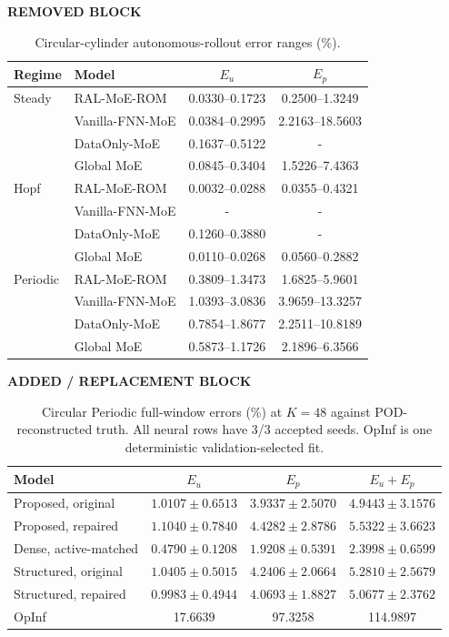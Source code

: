 \documentclass{article}
\providecommand{\DIFaddbegin}{} %
\providecommand{\DIFaddend}{} %
\providecommand{\DIFdelbegin}{} %
\providecommand{\DIFdelend}{} %
\begin{document}
\DIFdelbegin 
{\color{red}
\begin{table}[H]
\color{red}\noindent\textbf{REMOVED BLOCK}\par
\centering
\caption{Circular-cylinder autonomous-rollout error ranges (\%). }
\label{old:tab:circular_full}
\small
\setlength{\tabcolsep}{4pt}
\begin{tabular}{llcc}
\toprule
Regime & Model & $E_u$ & $E_p$ \\
\midrule
Steady & RAL-MoE-ROM & 0.0330--0.1723 & 0.2500--1.3249 \\
 & Vanilla-FNN-MoE & 0.0384--0.2995 & 2.2163--18.5603 \\
 & DataOnly-MoE & 0.1637--0.5122 & - \\
 & Global MoE & 0.0845--0.3404 & 1.5226--7.4363 \\
\midrule
Hopf & RAL-MoE-ROM & 0.0032--0.0288 & 0.0355--0.4321 \\
 & Vanilla-FNN-MoE & - & -  \\
 & DataOnly-MoE & 0.1260--0.3880 & - \\
 & Global MoE & 0.0110--0.0268 & 0.0560--0.2882 \\
\midrule
Periodic & RAL-MoE-ROM & 0.3809--1.3473 & 1.6825--5.9601 \\
 & Vanilla-FNN-MoE & 1.0393--3.0836 & 3.9659--13.3257 \\
 & DataOnly-MoE & 0.7854--1.8677 & 2.2511--10.8189 \\
 & Global MoE & 0.5873--1.1726 & 2.1896--6.3566 \\
\bottomrule
\end{tabular}
\end{table}
}
\DIFdelend \DIFaddbegin 
{\color{blue}
\begin{table}[H]
\color{blue}\noindent\textbf{ADDED / REPLACEMENT BLOCK}\par
\centering
\caption{Circular Periodic full-window errors (\%) at $K=48$ against
POD-reconstructed truth. All neural rows have 3/3 accepted seeds.
OpInf is one deterministic validation-selected fit.}
\label{tab:circular_full}
\small
\setlength{\tabcolsep}{3pt}
\begin{tabular}{@{}lccc@{}}
\toprule
Model & $E_u$ & $E_p$ & $E_u+E_p$\\
\midrule
Proposed, original & $1.0107\pm0.6513$ & $3.9337\pm2.5070$ & $4.9443\pm3.1576$\\
Proposed, repaired & $1.1040\pm0.7840$ & $4.4282\pm2.8786$ & $5.5322\pm3.6623$\\
Dense, active-matched & $\mathbf{0.4790\pm0.1208}$ & $\mathbf{1.9208\pm0.5391}$ & $\mathbf{2.3998\pm0.6599}$\\
Structured, original & $1.0405\pm0.5015$ & $4.2406\pm2.0664$ & $5.2810\pm2.5679$\\
Structured, repaired & $0.9983\pm0.4944$ & $4.0693\pm1.8827$ & $5.0677\pm2.3762$\\
OpInf & 17.6639 & 97.3258 & 114.9897\\
\bottomrule
\end{tabular}
\end{table}
}
\DIFaddend 
\end{document}
